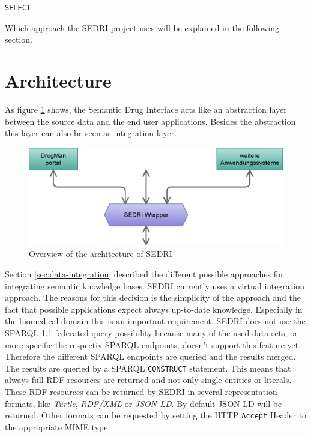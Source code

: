 \lstset{language=sparql}
\begin{lstlisting}[numbers=none,caption=Example of SPARQL 1.1 federated query]
  SELECT
\end{lstlisting}\todo{}
Which approach the SEDRI project uses will be explained in the following section.

\section{Architecture}
\label{sec:architecture}

As figure \ref{fig:arch_sedri} shows, the Semantic Drug Interface acts like an abstraction layer between the source data and the end user applications.
Besides the abstraction this layer can also be seen as integration layer.

\begin{figure}
  \centering
  \includegraphics[scale=0.7]{methods/wrapper.eps}
  \caption{Overview of the architecture of SEDRI}
  \label{fig:arch_sedri}
\end{figure}
Section \ref{sec:data-integration} described the different possible approaches for integrating semantic knowledge bases.
SEDRI currently uses a virtual integration approach.
The reasons for this decision is the simplicity of the approach and the fact that possible applications expect always up-to-date knowledge.
Especially in the biomedical domain this is an important requirement.
SEDRI does not use the SPARQL 1.1 federated query possibility because many of the used data sets, or more specific the respectiv SPARQL endpoints, doesn't support this feature yet.
Therefore the different SPARQL endpoints are queried and the results merged.
The results are queried by a SPARQL \texttt{CONSTRUCT} statement.
This means that always full RDF resources are returned and not only single entities or literals.
These RDF resources can be returned by SEDRI in several representation formats, like \textit{Turtle}, \textit{RDF/XML} or \textit{JSON-LD}.
By default JSON-LD will be returned.
Other formats can be requested by setting the HTTP \texttt{Accept} Header to the appropriate MIME type.

